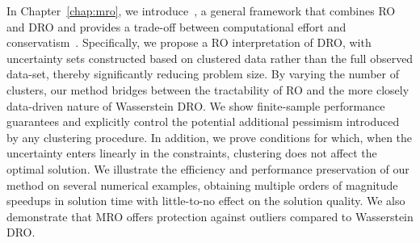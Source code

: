 In Chapter~\ref{chap:mro}, we introduce~, a general framework that combines \gls{RO} and \gls{DRO} and provides a trade-off between computational effort and conservatism~\cite{mro}. Specifically, we propose a \gls{RO} interpretation of \gls{DRO}, with uncertainty sets constructed based on clustered data rather than the full observed data-set, thereby significantly reducing problem size. By varying the number of clusters, our method bridges between the tractability of \gls{RO} and the more closely data-driven nature of Wasserstein \gls{DRO}. We show finite-sample performance guarantees and explicitly control the potential additional pessimism introduced by any clustering procedure.
In addition, we prove conditions for which, when the uncertainty enters linearly in the constraints, clustering does not affect the optimal solution. 
We illustrate the efficiency and performance preservation of our method on several numerical examples, obtaining multiple orders of magnitude speedups in solution time with little-to-no effect on the solution quality.
We also demonstrate that MRO offers protection against outliers compared to Wasserstein DRO.  

